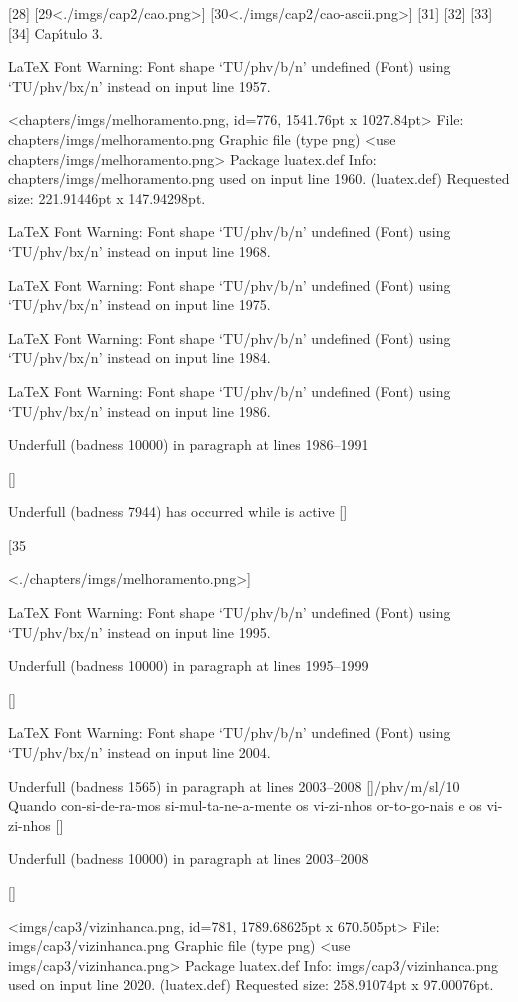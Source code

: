 [28] [29<./imgs/cap2/cao.png>] [30<./imgs/cap2/cao-ascii.png>] [31] [32] [33] [34]
Cap\'{\i }tulo 3.

LaTeX Font Warning: Font shape `TU/phv/b/n' undefined
(Font)              using `TU/phv/bx/n' instead on input line 1957.

<chapters/imgs/melhoramento.png, id=776, 1541.76pt x 1027.84pt>
File: chapters/imgs/melhoramento.png Graphic file (type png)
<use chapters/imgs/melhoramento.png>
Package luatex.def Info: chapters/imgs/melhoramento.png  used on input line 1960.
(luatex.def)             Requested size: 221.91446pt x 147.94298pt.

LaTeX Font Warning: Font shape `TU/phv/b/n' undefined
(Font)              using `TU/phv/bx/n' instead on input line 1968.


LaTeX Font Warning: Font shape `TU/phv/b/n' undefined
(Font)              using `TU/phv/bx/n' instead on input line 1975.


LaTeX Font Warning: Font shape `TU/phv/b/n' undefined
(Font)              using `TU/phv/bx/n' instead on input line 1984.


LaTeX Font Warning: Font shape `TU/phv/b/n' undefined
(Font)              using `TU/phv/bx/n' instead on input line 1986.


Underfull \hbox (badness 10000) in paragraph at lines 1986--1991

 []


Underfull \vbox (badness 7944) has occurred while \output is active []

[35

<./chapters/imgs/melhoramento.png>]

LaTeX Font Warning: Font shape `TU/phv/b/n' undefined
(Font)              using `TU/phv/bx/n' instead on input line 1995.


Underfull \hbox (badness 10000) in paragraph at lines 1995--1999

 []


LaTeX Font Warning: Font shape `TU/phv/b/n' undefined
(Font)              using `TU/phv/bx/n' instead on input line 2004.


Underfull \hbox (badness 1565) in paragraph at lines 2003--2008
[]\TU/phv/m/sl/10 Quando con-si-de-ra-mos si-mul-ta-ne-a-mente os vi-zi-nhos or-to-go-nais e os vi-zi-nhos
 []


Underfull \hbox (badness 10000) in paragraph at lines 2003--2008

 []

<imgs/cap3/vizinhanca.png, id=781, 1789.68625pt x 670.505pt>
File: imgs/cap3/vizinhanca.png Graphic file (type png)
<use imgs/cap3/vizinhanca.png>
Package luatex.def Info: imgs/cap3/vizinhanca.png  used on input line 2020.
(luatex.def)             Requested size: 258.91074pt x 97.00076pt.

